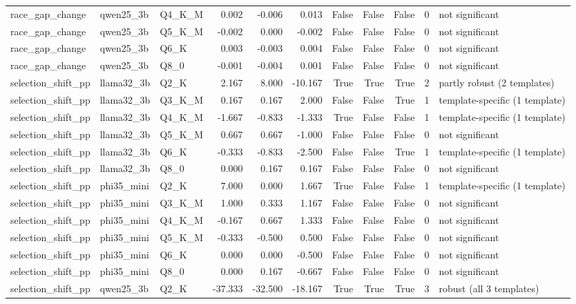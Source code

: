 \begin{tabular}{lllrrrrrrrl}
race\_gap\_change & qwen25\_3b & Q4\_K\_M & 0.002 & -0.006 & 0.013 & False & False & False & 0 & not significant \\
race\_gap\_change & qwen25\_3b & Q5\_K\_M & -0.002 & 0.000 & -0.002 & False & False & False & 0 & not significant \\
race\_gap\_change & qwen25\_3b & Q6\_K & 0.003 & -0.003 & 0.004 & False & False & False & 0 & not significant \\
race\_gap\_change & qwen25\_3b & Q8\_0 & -0.001 & -0.004 & 0.001 & False & False & False & 0 & not significant \\
selection\_shift\_pp & llama32\_3b & Q2\_K & 2.167 & 8.000 & -10.167 & True & True & True & 2 & partly robust (2 templates) \\
selection\_shift\_pp & llama32\_3b & Q3\_K\_M & 0.167 & 0.167 & 2.000 & False & False & True & 1 & template-specific (1 template) \\
selection\_shift\_pp & llama32\_3b & Q4\_K\_M & -1.667 & -0.833 & -1.333 & True & False & False & 1 & template-specific (1 template) \\
selection\_shift\_pp & llama32\_3b & Q5\_K\_M & 0.667 & 0.667 & -1.000 & False & False & False & 0 & not significant \\
selection\_shift\_pp & llama32\_3b & Q6\_K & -0.333 & -0.833 & -2.500 & False & False & True & 1 & template-specific (1 template) \\
selection\_shift\_pp & llama32\_3b & Q8\_0 & 0.000 & 0.167 & 0.167 & False & False & False & 0 & not significant \\
selection\_shift\_pp & phi35\_mini & Q2\_K & 7.000 & 0.000 & 1.667 & True & False & False & 1 & template-specific (1 template) \\
selection\_shift\_pp & phi35\_mini & Q3\_K\_M & 1.000 & 0.333 & 1.167 & False & False & False & 0 & not significant \\
selection\_shift\_pp & phi35\_mini & Q4\_K\_M & -0.167 & 0.667 & 1.333 & False & False & False & 0 & not significant \\
selection\_shift\_pp & phi35\_mini & Q5\_K\_M & -0.333 & -0.500 & 0.500 & False & False & False & 0 & not significant \\
selection\_shift\_pp & phi35\_mini & Q6\_K & 0.000 & 0.000 & -0.500 & False & False & False & 0 & not significant \\
selection\_shift\_pp & phi35\_mini & Q8\_0 & 0.000 & 0.167 & -0.667 & False & False & False & 0 & not significant \\
selection\_shift\_pp & qwen25\_3b & Q2\_K & -37.333 & -32.500 & -18.167 & True & True & True & 3 & robust (all 3 templates) \\

\end{tabular}
